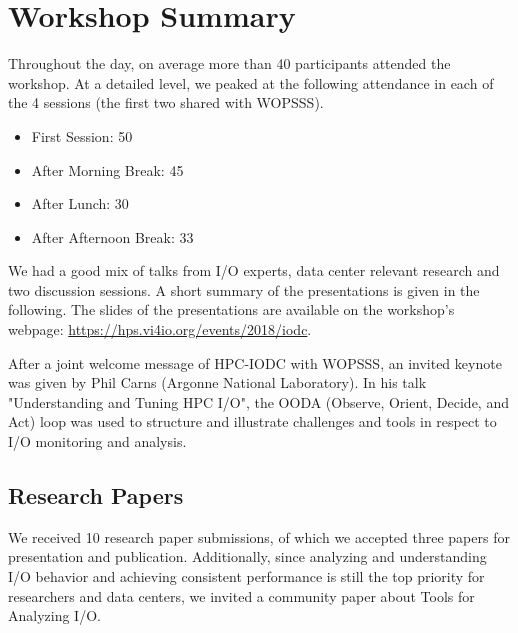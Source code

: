 \documentclass{llncs}
\begin{document}
\section{Workshop Summary}
\label{sec:summary}

Throughout the day, on average more than 40 participants attended the workshop.
At a detailed level, we peaked at the following attendance in each of the 4 sessions (the first two
shared with WOPSSS).
\begin{itemize}
\item First Session: 50
\item After Morning Break: 45
\item After Lunch: 30
\item After Afternoon Break: 33
\end{itemize}
We had a good mix of talks from I/O experts, data center relevant research and  two discussion sessions.
A short summary of the presentations is given in the following.
The slides of the presentations are available on the workshop's webpage:
\url{https://hps.vi4io.org/events/2018/iodc}.

After a joint welcome message of HPC-IODC with WOPSSS, an invited keynote was given by Phil Carns (Argonne National Laboratory).
In his talk "Understanding and Tuning HPC I/O", the OODA (Observe, Orient, Decide, and Act) loop was used to structure and illustrate challenges and tools in respect to I/O monitoring and analysis.


\subsection{Research Papers}

We received 10 research paper submissions, of which we accepted three papers for presentation and publication.
Additionally, since analyzing and understanding I/O behavior and achieving consistent performance is still the top priority for researchers and data centers, we invited a community paper about Tools for Analyzing I/O.
\end{document}

